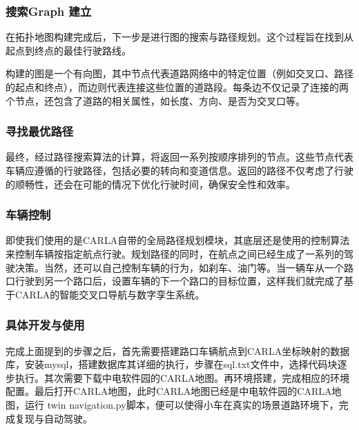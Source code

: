 \subsubsection{搜索Graph 建立}

在拓扑地图构建完成后，下一步是进行图的搜索与路径规划。这个过程旨在找到从起点到终点的最佳行驶路线。

构建的图是一个有向图，其中节点代表道路网络中的特定位置（例如交叉口、路径的起点和终点），而边则代表连接这些位置的道路段。每条边不仅记录了连接的两个节点，还包含了道路的相关属性，如长度、方向、是否为交叉口等。



\subsubsection{寻找最优路径}

最终，经过路径搜索算法的计算，将返回一系列按顺序排列的节点。这些节点代表车辆应遵循的行驶路径，包括必要的转向和变道信息。返回的路径不仅考虑了行驶的顺畅性，还会在可能的情况下优化行驶时间，确保安全性和效率。


\subsubsection{车辆控制}

即使我们使用的是CARLA自带的全局路径规划模块，其底层还是使用的控制算法来控制车辆按指定航点行驶。规划路径的同时，在航点之间已经生成了一系列的驾驶决策。当然，还可以自己控制车辆的行为，如刹车、油门等。当一辆车从一个路口行驶到另一个路口后，设置车辆的下一个路口的目标位置，这样我们就完成了基于CARLA的智能交叉口导航与数字孪生系统。

\subsubsection{具体开发与使用}

完成上面提到的步骤之后，首先需要搭建路口车辆航点到CARLA坐标映射的数据库，安装mysql，搭建数据库其详细的执行，步骤在sql.txt文件中，选择代码块逐步执行。其次需要下载中电软件园的CARLA地图。再环境搭建，完成相应的环境配置。最后打开CARLA地图，此时CARLA地图已经是中电软件园的CARLA地图，运行 twin navigation.py脚本，便可以使得小车在真实的场景道路环境下，完成复现与自动驾驶。








